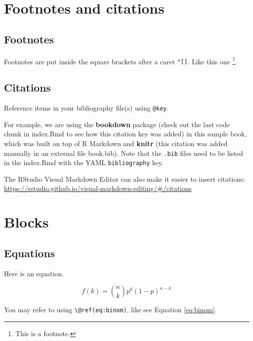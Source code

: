 \documentclass[
]{book}
\theoremstyle{definition}
\theoremstyle{definition}
\theoremstyle{definition}
\theoremstyle{definition}
\theoremstyle{remark}
\begin{document}
\hypertarget{footnotes-and-citations}{%
\chapter{Footnotes and citations}\label{footnotes-and-citations}}

\hypertarget{footnotes}{%
\section{Footnotes}\label{footnotes}}

Footnotes are put inside the square brackets after a caret \texttt{\^{}{[}{]}}. Like this one \footnote{This is a footnote.}.

\hypertarget{citations}{%
\section{Citations}\label{citations}}

Reference items in your bibliography file(s) using \texttt{@key}.

For example, we are using the \textbf{bookdown} package \citep{R-bookdown} (check out the last code chunk in index.Rmd to see how this citation key was added) in this sample book, which was built on top of R Markdown and \textbf{knitr} \citep{xie2015} (this citation was added manually in an external file book.bib).
Note that the \texttt{.bib} files need to be listed in the index.Rmd with the YAML \texttt{bibliography} key.

The RStudio Visual Markdown Editor can also make it easier to insert citations: \url{https://rstudio.github.io/visual-markdown-editing/\#/citations}

\hypertarget{blocks}{%
\chapter{Blocks}\label{blocks}}

\hypertarget{equations}{%
\section{Equations}\label{equations}}

Here is an equation.

\begin{equation} 
  f\left(k\right) = \binom{n}{k} p^k\left(1-p\right)^{n-k}
  \label{eq:binom}
\end{equation}

You may refer to using \texttt{\textbackslash{}@ref(eq:binom)}, like see Equation \eqref{eq:binom}.
\end{document}
